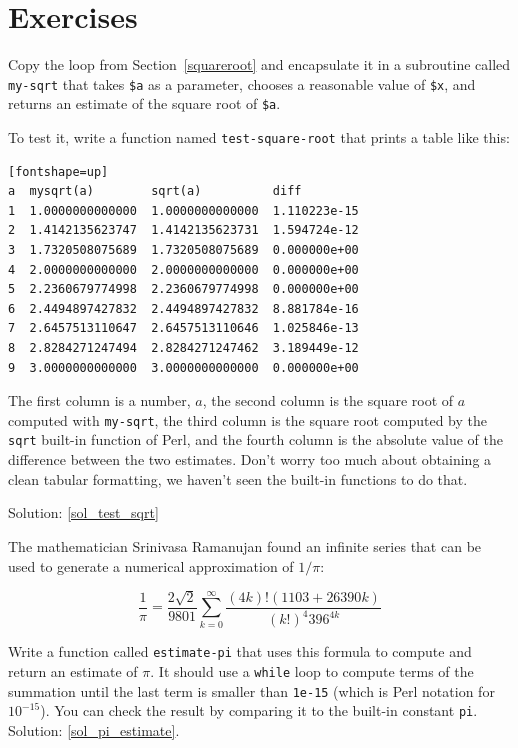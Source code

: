 \section{Exercises}

\begin{exercise}
\label{test_sqrt}

Copy the loop from Section~\ref{squareroot}
and encapsulate it in a subroutine called
\verb"my-sqrt" that takes {\tt \$a} as a parameter, chooses a
reasonable value of {\tt \$x}, and returns an estimate of 
the square root of {\tt \$a}.

To test it, write a function named \verb"test-square-root"
that prints a table like this:

\begin{verbatim}[fontshape=up]
a  mysqrt(a)        sqrt(a)          diff
1  1.0000000000000  1.0000000000000  1.110223e-15
2  1.4142135623747  1.4142135623731  1.594724e-12
3  1.7320508075689  1.7320508075689  0.000000e+00
4  2.0000000000000  2.0000000000000  0.000000e+00
5  2.2360679774998  2.2360679774998  0.000000e+00
6  2.4494897427832  2.4494897427832  8.881784e-16
7  2.6457513110647  2.6457513110646  1.025846e-13
8  2.8284271247494  2.8284271247462  3.189449e-12
9  3.0000000000000  3.0000000000000  0.000000e+00

\end{verbatim}
%
The first column is a number, $a$, the second column is the 
square root of $a$ computed with \verb"my-sqrt", the third 
column is the square root computed by the {\tt sqrt} built-in 
function of Perl, and the fourth column is the absolute value of 
the difference between the two estimates. Don't worry too much about 
obtaining a clean tabular formatting, we haven't 
seen the built-in functions to do that. 

Solution: \ref{sol_test_sqrt}
%

\end{exercise}



\begin{exercise}
\label{pi_estimate}

The mathematician Srinivasa Ramanujan found an infinite 
series that can be used to generate a numerical
approximation of $1 / \pi$:

\[ \frac{1}{\pi} = \frac{2\sqrt{2}}{9801} 
\sum^\infty_{k=0} \frac{(4k)!(1103+26390k)}{(k!)^4 396^{4k}} \]

Write a function called \verb"estimate-pi" that uses this 
formula to compute and return an estimate of $\pi$.  It 
should use a {\tt while} loop to compute terms of the 
summation until the last term is smaller than {\tt 1e-15} 
(which is Perl notation for $10^{-15}$). You can check
the result by comparing it to the built-in constant {\tt pi}.
Solution: \ref{sol_pi_estimate}.

\end{exercise}


